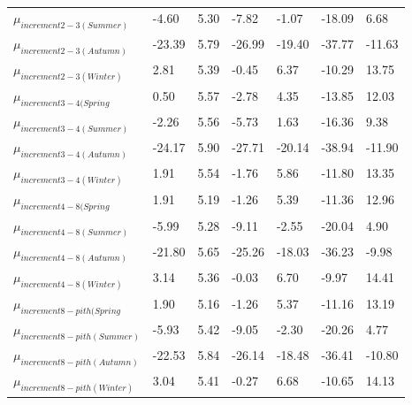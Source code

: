 \documentclass{article}\usepackage[]{graphicx}\usepackage[]{color}
\begin{document}
\begin{table}[ht]
\begin{tabular}{|p{}|p{}|p{}|p{}|p{}|p{}|p{}|}
  $\mu_{increment 2-3 (Summer)}$ & -4.60 & 5.30 & -7.82 & -1.07 & -18.09 & 6.68 \\ 
  $\mu_{increment 2-3 (Autumn)}$ & -23.39 & 5.79 & -26.99 & -19.40 & -37.77 & -11.63 \\ 
  $\mu_{increment 2-3 (Winter)}$ & 2.81 & 5.39 & -0.45 & 6.37 & -10.29 & 13.75 \\ 
  $\mu_{increment 3-4 (Spring}$ & 0.50 & 5.57 & -2.78 & 4.35 & -13.85 & 12.03 \\ 
  $\mu_{increment 3-4 (Summer)}$ & -2.26 & 5.56 & -5.73 & 1.63 & -16.36 & 9.38 \\ 
  $\mu_{increment 3-4 (Autumn)}$ & -24.17 & 5.90 & -27.71 & -20.14 & -38.94 & -11.90 \\ 
  $\mu_{increment 3-4 (Winter)}$ & 1.91 & 5.54 & -1.76 & 5.86 & -11.80 & 13.35 \\ 
  $\mu_{increment 4-8 (Spring}$ & 1.91 & 5.19 & -1.26 & 5.39 & -11.36 & 12.96 \\ 
  $\mu_{increment 4-8 (Summer)}$ & -5.99 & 5.28 & -9.11 & -2.55 & -20.04 & 4.90 \\ 
  $\mu_{increment 4-8 (Autumn)}$ & -21.80 & 5.65 & -25.26 & -18.03 & -36.23 & -9.98 \\ 
  $\mu_{increment 4-8 (Winter)}$ & 3.14 & 5.36 & -0.03 & 6.70 & -9.97 & 14.41 \\ 
  $\mu_{increment 8-pith (Spring}$ & 1.90 & 5.16 & -1.26 & 5.37 & -11.16 & 13.19 \\ 
  $\mu_{increment 8-pith (Summer)}$ & -5.93 & 5.42 & -9.05 & -2.30 & -20.26 & 4.77 \\ 
  $\mu_{increment 8-pith (Autumn)}$ & -22.53 & 5.84 & -26.14 & -18.48 & -36.41 & -10.80 \\ 
  $\mu_{increment 8-pith (Winter)}$ & 3.04 & 5.41 & -0.27 & 6.68 & -10.65 & 14.13 \\ 
   \hline
\end{tabular}
\endgroup
\end{table}
\end{document}
